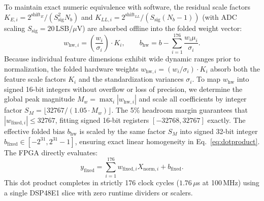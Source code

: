 \documentclass[10pt,twocolumn,letterpaper]{article}
\begin{document}
To maintain exact numeric equivalence with software, the residual scale factors $K_{E,i} = 2^{\text{shift}_E} / (S_{\text{sig}}^2 N_b)$ and $K_{LL,i} = 2^{\text{shift}_{LL}} / (S_{\text{sig}} (N_b - 1))$ (with ADC scaling $S_{\text{sig}} = 20$\,LSB/$\mu$V) are absorbed offline into the folded weight vector:
\begin{equation}
w_{\text{hw},i} = \left(\frac{w_i}{\sigma_i}\right) \cdot K_i, \qquad b_{\text{hw}} = b - \sum_{i=1}^{176} \frac{w_i \mu_i}{\sigma_i}.
\end{equation}
Because individual feature dimensions exhibit wide dynamic ranges prior to normalization, the folded hardware weights $w_{\text{hw},i} = (w_i / \sigma_i) \cdot K_i$ absorb both the feature scale factors $K_i$ and the standardization variances $\sigma_i$. To map $w_{\text{hw}}$ into signed 16-bit integers without overflow or loss of precision, we determine the global peak magnitude $M_w = \max_i |w_{\text{hw},i}|$ and scale all coefficients by integer factor $S_M = \lfloor 32767 / (1.05 \cdot M_w) \rfloor$. The 5\% headroom margin guarantees that $|w_{\text{fixed},i}| \le 32767$, fitting signed 16-bit registers $[-32768, 32767]$ exactly. The effective folded bias $b_{\text{hw}}$ is scaled by the same factor $S_M$ into signed 32-bit integer $b_{\text{fixed}} \in [-2^{31}, 2^{31}-1]$, ensuring exact linear homogeneity in Eq.~\eqref{eq:dotproduct}. The FPGA directly evaluates:
\begin{equation}
y_{\text{fixed}} = \sum_{i=1}^{176} w_{\text{fixed},i} X_{\text{norm},i} + b_{\text{fixed}}. \label{eq:dotproduct}
\end{equation}
This dot product completes in strictly 176 clock cycles ($1.76\,\mu$s at 100\,MHz) using a single DSP48E1 slice with zero runtime dividers or scalers.
\end{document}
